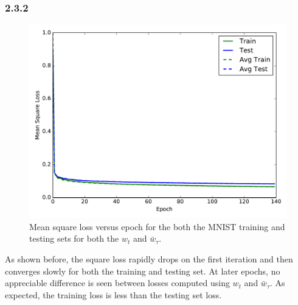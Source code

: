 \documentclass[12pt]{amsart}
\begin{document}
\subsubsection*{2.3.2}
\begin{figure}[H]
	\includegraphics[width=\columnwidth]{nn_square_loss.pdf}
    \caption{Mean square loss versus epoch for the both the MNIST training and testing sets for both the $w_t$ and $\bar{w}_{\tau}$.}
    \label{fig:nn_square_loss}
\end{figure}
As shown before, the square loss rapidly drops on the first iteration and then converges slowly for both the training and testing set.  At later epochs, no appreciable difference is seen between losses computed using $w_t$ and $\bar{w}_{\tau}$.  As expected, the training loss is less than the testing set loss.
\end{document}
